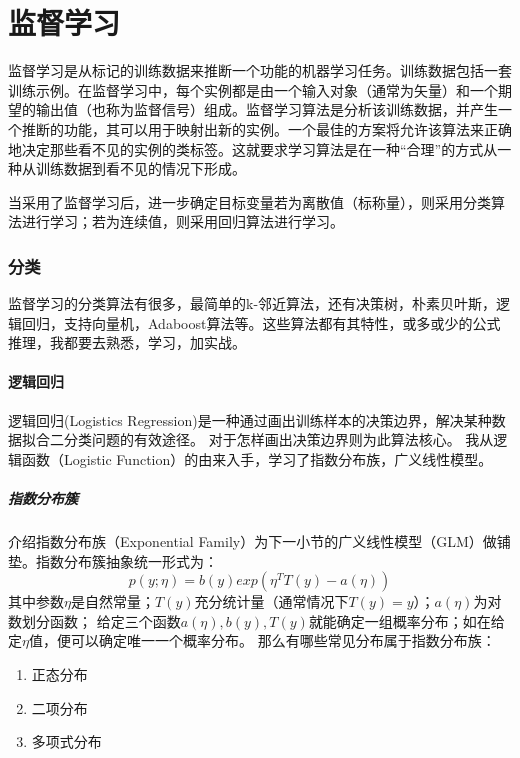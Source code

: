 \part{监督学习}
监督学习是从标记的训练数据来推断一个功能的机器学习任务。训练数据包括一套训练示例。在监督学习中，每个实例都是由一个输入对象（通常为矢量）和一个期望的输出值（也称为监督信号）组成。监督学习算法是分析该训练数据，并产生一个推断的功能，其可以用于映射出新的实例。一个最佳的方案将允许该算法来正确地决定那些看不见的实例的类标签。这就要求学习算法是在一种“合理”的方式从一种从训练数据到看不见的情况下形成。

当采用了监督学习后，进一步确定目标变量若为离散值（标称量），则采用分类算法进行学习；若为连续值，则采用回归算法进行学习。

\section{分类}
监督学习的分类算法有很多，最简单的k-邻近算法，还有决策树，朴素贝叶斯，逻辑回归，支持向量机，Adaboost算法等。这些算法都有其特性，或多或少的公式推理，我都要去熟悉，学习，加实战。



\subsection{逻辑回归}

逻辑回归(Logistics Regression)是一种通过画出训练样本的决策边界，解决某种数据拟合二分类问题的有效途径。
对于怎样画出决策边界则为此算法核心。
我从逻辑函数（Logistic Function）的由来入手，学习了指数分布族，广义线性模型。

\subsubsection{指数分布簇}

介绍指数分布族（Exponential Family）为下一小节的广义线性模型（GLM）做铺垫。指数分布簇抽象统一形式为：
\begin{equation}
  p(y;\eta)=b(y)exp(\eta^T T(y)-a(\eta))
\end{equation}
其中参数$\eta$是自然常量；$T(y)$充分统计量（通常情况下$T(y)=y$）；$a(\eta)$为对数划分函数；
给定三个函数$a(\eta),b(y),T(y)$就能确定一组概率分布；如在给定$\eta$值，便可以确定唯一一个概率分布。
那么有哪些常见分布属于指数分布族：
\begin{enumerate}
  \item 正态分布
  \item 二项分布
  \item 多项式分布
\end{enumerate}

